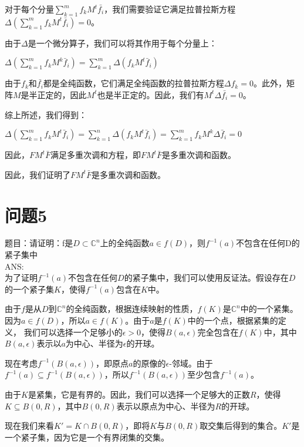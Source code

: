 \documentclass[12pt, a4paper, oneside]{article}
\begin{document}
\begin{spacing}{2.0}
对于每个分量$\sum_{k=1}^{m} f_k M^t \bar{f_i}$，我们需要验证它满足拉普拉斯方程$\Delta (\sum_{k=1}^{m} f_k M^t \bar{f_i}) = 0$。

由于$\Delta$是一个微分算子，我们可以将其作用于每个分量上：

\begin{center}
    $\Delta(\sum\limits_{k=1}^{m}f_kM^k\bar{f}_i)=\sum\limits_{k=1}^{m}\Delta(f_kM^t\bar{f}_i)$
\end{center}
由于$f_k$和$\bar{f_i}$都是全纯函数，它们满足全纯函数的拉普拉斯方程$\Delta f_k = 0$。此外，矩阵$M$是半正定的，因此$M^t$也是半正定的。因此，我们有$M^t \Delta \bar{f_i} = 0$。

综上所述，我们得到：

\begin{center}
    $\Delta(\sum\limits_{k=1}^{m}f_kM^t\bar{f}_i)=\sum\limits_{k=1}^{n}\Delta(f_kM^t\bar{f}_i)=\sum\limits_{k=1}^{m}f_kM^k\Delta\bar{f}_i=0$
\end{center}

因此，$FM^t\bar{F}$满足多重次调和方程，即$FM^t\bar{F}$是多重次调和函数。

因此，我们证明了$FM^t\bar{F}$是多重次调和函数。


\section{问题5}
题目：请证明：f是$D\subset \mathbb{C} ^n$上的全纯函数$a\in f(D)$，则$f^{-1}(a)$不包含在任何D的紧子集中
\\
ANS:\\
为了证明$f^{-1}(a)$不包含在任何$D$的紧子集中，我们可以使用反证法。假设存在$D$的一个紧子集$K$，使得$f^{-1}(a)$包含在$K$中。

由于$f$是从$D$到$\mathbb{C}^n$的全纯函数，根据连续映射的性质，$f(K)$是$\mathbb{C}^n$中的一个紧集。因为$a\in f(D)$，所以$a\in f(K)$。由于$a$是$f(K)$中的一个点，根据紧集的定义，
我们可以选择一个足够小的$\epsilon>0$，使得$B(a,\epsilon)$完全包含在$f(K)$中，其中$B(a,\epsilon)$表示以$a$为中心、半径为$\epsilon$的开球。

现在考虑$f^{-1}(B(a,\epsilon))$，即原点$a$的原像的$\epsilon$-邻域。由于$f^{-1}(a)\subseteq f^{-1}(B(a,\epsilon))$，所以$f^{-1}(B(a,\epsilon))$至少包含$f^{-1}(a)$。

由于$K$是紧集，它是有界的。因此，我们可以选择一个足够大的正数$R$，使得$K\subseteq B(0,R)$，其中$B(0,R)$表示以原点为中心、半径为$R$的开球。

现在我们来看$K' = K \cap B(0,R)$，即将$K$与$B(0,R)$取交集后得到的集合。$K'$是一个紧子集，因为它是一个有界闭集的交集。


\end{spacing}
\end{document}

